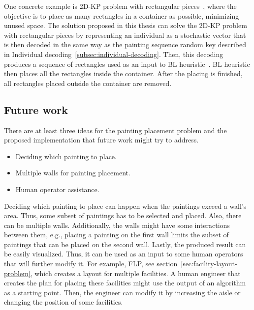 One concrete example is 2D-KP problem with rectangular pieces~\cite{bortfeldtGeneticAlgorithmTwodimensional2009},
where the objective is to place as many rectangles in a container as possible,
minimizing unused space.
The solution proposed in this thesis can solve the 2D-KP problem with rectangular pieces by
representing an individual as a stochastic vector that is then decoded
in the same way as the painting sequence random key described in Individual decoding~\ref{subsec:individual-decoding}.
Then, this decoding produces a sequence of rectangles used as an input to BL heuristic~\cite{chazelleBottomnLeftBinPackingHeuristic1983}.
BL heuristic then places all the rectangles inside the container.
After the placing is finished, all rectangles placed outside the container are removed.

\subsection{Future work}\label{subsec:future-work}

There are at least three ideas for the painting placement problem and the proposed implementation that future work might try to address.

\begin{itemize}
    \item Deciding which painting to place.
    \item Multiple walls for painting placement.
    \item Human operator assistance.
\end{itemize}

Deciding which painting to place can happen when the paintings exceed a wall's area.
Thus, some subset of paintings has to be selected and placed.
Also, there can be multiple walls.
Additionally, the walls might have some interactions between them, e.g., placing a painting on the first wall
limits the subset of paintings that can be placed on the second wall.
Lastly, the produced result can be easily visualized.
Thus, it can be used as an input to some human operators that will further modify it.
For example, FLP, see section~\ref{sec:facility-layout-problem}, which creates a layout for multiple facilities.
A human engineer that creates the plan for placing these facilities might use the output of an algorithm as a starting point.
Then, the engineer can modify it by increasing the aisle or changing the position of some facilities.
